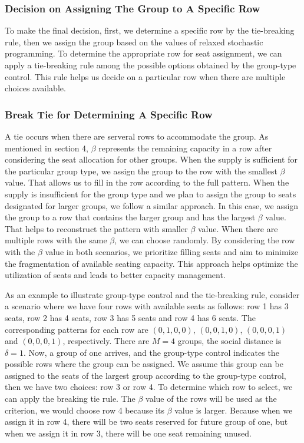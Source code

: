 \subsubsection{Decision on Assigning The Group to A Specific Row}
To make the final decision, first, we determine a specific row by the tie-breaking rule, then we assign the group based on the values of relaxed stochastic programming. To determine the appropriate row for seat assignment, we can apply a tie-breaking rule among the possible options obtained by the group-type control. This rule helps us decide on a particular row when there are multiple choices available. 

\subsubsection*{Break Tie for Determining A Specific Row}
A tie occurs when there are serveral rows to accommodate the group. As mentioned in section 4, $\beta$ represents the remaining capacity in a row after considering the seat allocation for other groups.
When the supply is sufficient for the particular group type, we assign the group to the row with the smallest $\beta$ value. That allows us to fill in the row according to the full pattern. When the supply is insufficient for the group type and we plan to assign the group to seats designated for larger groups, we follow a similar approach. In this case, we assign the group to a row that contains the larger group and has the largest $\beta$ value. That helps to reconstruct the pattern with smaller $\beta$ value. When there are multiple rows with the same $\beta$, we can choose randomly. By considering the row with the $\beta$ value in both scenarios, we prioritize filling seats and aim to minimize the fragmentation of available seating capacity. This approach helps optimize the utilization of seats and leads to better capacity management.

As an example to illustrate group-type control and the tie-breaking rule, consider a scenario where we have four rows with available seats as follows: row 1 has 3 seats, row 2 has 4 seats, row 3 has 5 seats and row 4 has 6 seats. The corresponding patterns for each row are $(0,1,0,0)$, $(0,0,1,0)$, $(0,0,0,1)$ and $(0,0,0,1)$, respectively. There are $M =4$ groups, the social distance is $\delta =1$. Now, a group of one arrives,  and the group-type control indicates the possible rows where the group can be assigned. We assume this group can be assigned to the seats of the largest group according to the group-type control, then we have two choices: row 3 or row 4. To determine which row to select, we can apply the breaking tie rule. The $\beta$ value of the rows will be used as the criterion, we would choose row 4 because its $\beta$ value is larger. Because when we assign it in row 4, there will be two seats reserved for future group of one, but when we assign it in row 3, there will be one seat remaining unused.

